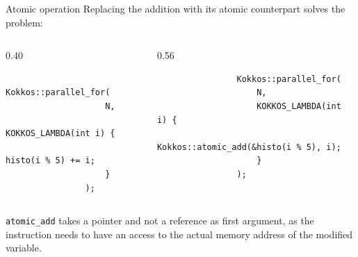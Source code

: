\documentclass[
    aspectratio=169,
]{beamer}
\begin{document}
\begin{frame}[fragile]{Atomic operation}
    Replacing the addition with its atomic counterpart solves the problem:
    \begin{columns}
        \begin{column}{0.40\linewidth}
            \begin{verbatim}
                Kokkos::parallel_for(
                    N,
                    KOKKOS_LAMBDA(int i) {
                        histo(i % 5) += i;
                    }
                );
            \end{verbatim}
        \end{column}
        \begin{column}{0.56\linewidth}
            \begin{verbatim}
                Kokkos::parallel_for(
                    N,
                    KOKKOS_LAMBDA(int i) {
                        Kokkos::atomic_add(&histo(i % 5), i);
                    }
                );
            \end{verbatim}
        \end{column}
    \end{columns}
     \texttt{atomic\_add} takes a pointer and not a
    reference as first argument, as the instruction needs to have an access to
    the actual memory address of the modified variable.
\end{frame}
\end{document}
